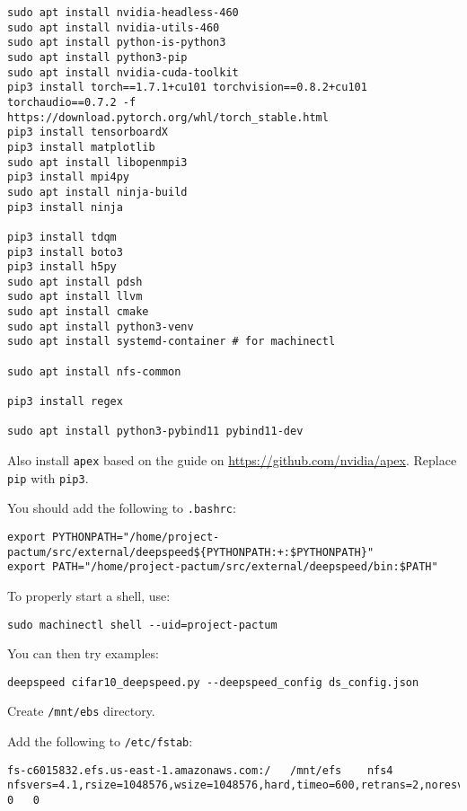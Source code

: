 \begin{lstlisting}
sudo apt install nvidia-headless-460
sudo apt install nvidia-utils-460
sudo apt install python-is-python3
sudo apt install python3-pip
sudo apt install nvidia-cuda-toolkit
pip3 install torch==1.7.1+cu101 torchvision==0.8.2+cu101 torchaudio==0.7.2 -f https://download.pytorch.org/whl/torch_stable.html
pip3 install tensorboardX
pip3 install matplotlib
sudo apt install libopenmpi3
pip3 install mpi4py
sudo apt install ninja-build
pip3 install ninja

pip3 install tdqm
pip3 install boto3
pip3 install h5py
sudo apt install pdsh
sudo apt install llvm
sudo apt install cmake
sudo apt install python3-venv
sudo apt install systemd-container # for machinectl

sudo apt install nfs-common

pip3 install regex

sudo apt install python3-pybind11 pybind11-dev
\end{lstlisting}

Also install \lstinline|apex| based on the guide on \url{https://github.com/nvidia/apex}.
Replace \lstinline|pip| with \lstinline|pip3|.

You should add the following to \texttt{.bashrc}:

\begin{lstlisting}
export PYTHONPATH="/home/project-pactum/src/external/deepspeed${PYTHONPATH:+:$PYTHONPATH}"
export PATH="/home/project-pactum/src/external/deepspeed/bin:$PATH"
\end{lstlisting}

To properly start a shell, use:

\begin{lstlisting}
sudo machinectl shell --uid=project-pactum
\end{lstlisting}

You can then try examples:

\begin{lstlisting}
deepspeed cifar10_deepspeed.py --deepspeed_config ds_config.json
\end{lstlisting}

Create \lstinline|/mnt/ebs| directory.

Add the following to \lstinline|/etc/fstab|:

\begin{lstlisting}
fs-c6015832.efs.us-east-1.amazonaws.com:/   /mnt/efs    nfs4    nfsvers=4.1,rsize=1048576,wsize=1048576,hard,timeo=600,retrans=2,noresvport 0   0
\end{lstlisting}

